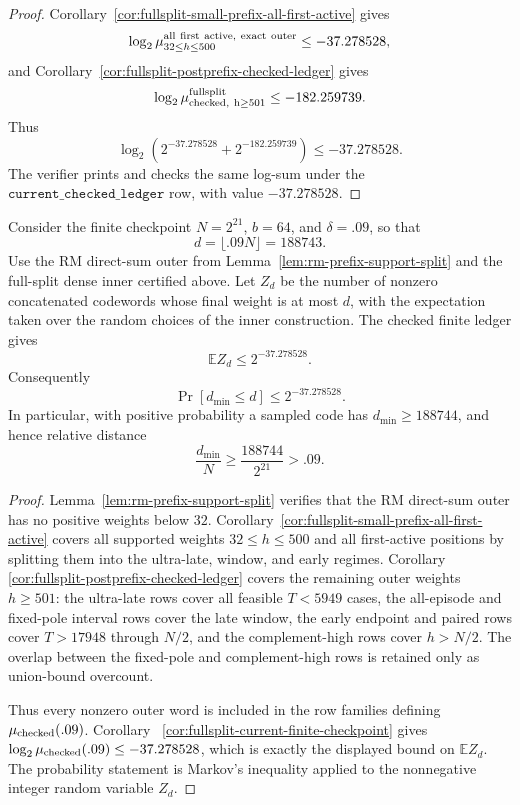 \begin{proof}
Corollary~\ref{cor:fullsplit-small-prefix-all-first-active} gives
\[
\log_2\mu_{32\le h\le500}^{\rm all\ first\ active,\ exact\ outer}\le -37.278528,
\]
and Corollary~\ref{cor:fullsplit-postprefix-checked-ledger} gives
\[
\log_2\mu_{\rm checked,\ h\ge501}^{\rm fullsplit}\le -182.259739.
\]
Thus
\[
\log_2\!\left(2^{-37.278528}+2^{-182.259739}\right)\le -37.278528.
\]
The verifier prints and checks the same log-sum under the
\(\texttt{current\_checked\_ledger}\) row, with value \(-37.278528\).
\end{proof}

\begin{theorem}
\label{thm:fullsplit-rm-finite-certificate-009}
Consider the finite checkpoint \(N=2^{21}\), \(b=64\), and \(\delta=.09\), so that
\[
d=\lfloor .09N\rfloor=188743 .
\]
Use the RM direct-sum outer from Lemma~\ref{lem:rm-prefix-support-split} and the full-split dense inner certified
above.  Let \(Z_d\) be the number of nonzero concatenated codewords whose final weight is at most \(d\), with the
expectation taken over the random choices of the inner construction.  The checked finite ledger gives
\[
\mathbb E Z_d\le 2^{-37.278528}.
\]
Consequently
\[
\Pr[d_{\min}\le d]\le 2^{-37.278528}.
\]
In particular, with positive probability a sampled code has \(d_{\min}\ge188744\), and hence relative distance
\[
\frac{d_{\min}}{N}\ge \frac{188744}{2^{21}}>.09 .
\]
\end{theorem}

\begin{proof}
Lemma~\ref{lem:rm-prefix-support-split} verifies that the RM direct-sum outer has no positive weights below \(32\).
Corollary~\ref{cor:fullsplit-small-prefix-all-first-active} covers all supported weights \(32\le h\le500\) and all
first-active positions by splitting them into the ultra-late, window, and early regimes.  Corollary~
\ref{cor:fullsplit-postprefix-checked-ledger} covers the remaining outer weights \(h\ge501\): the ultra-late rows cover
all feasible \(T<5949\) cases, the all-episode and fixed-pole interval rows cover the late window, the early endpoint
and paired rows cover \(T>17948\) through \(N/2\), and the complement-high rows cover \(h>N/2\).  The overlap between
the fixed-pole and complement-high rows is retained only as union-bound overcount.

Thus every nonzero outer word is included in the row families defining \(\mu_{\rm checked}(.09)\).  Corollary~
\ref{cor:fullsplit-current-finite-checkpoint} gives \(\log_2\mu_{\rm checked}(.09)\le -37.278528\), which is exactly
the displayed bound on \(\mathbb E Z_d\).  The probability statement is Markov's inequality applied to the nonnegative
integer random variable \(Z_d\).
\end{proof}

